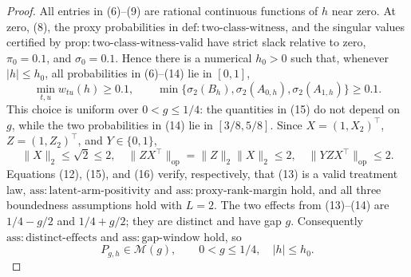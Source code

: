 \documentclass{article}
\begin{document}
\begin{proof}
All entries in (6)--(9) are rational continuous functions of \(h\) near zero.  At zero, (8), the proxy probabilities in \(\mathrm{def:two\text{-}class\text{-}witness}\), and the singular values certified by \(\mathrm{prop:two\text{-}class\text{-}witness\text{-}valid}\) have strict slack relative to zero, \(\pi_0=0.1\), and \(\sigma_0=0.1\).  Hence there is a numerical \(h_0>0\) such that, whenever \(|h|\le h_0\), all probabilities in (6)--(14) lie in \([0,1]\),
\[
 \min_{t,u}w_{tu}(h)\ge0.1,
 \qquad
 \min\{\sigma_2(B_h),\sigma_2(A_{0,h}),\sigma_2(A_{1,h})\}\ge0.1.                \tag{15}
\]
This choice is uniform over \(0<g\le1/4\): the quantities in (15) do not depend on \(g\), while the two probabilities in (14) lie in \([3/8,5/8]\).  Since \(X=(1,X_2)^\top\), \(Z=(1,Z_2)^\top\), and \(Y\in\{0,1\}\),
\[
 \lVert X\rVert_2\le\sqrt2\le2,
 \quad
 \lVert ZX^\top\rVert_{\mathrm{op}}=\lVert Z\rVert_2\lVert X\rVert_2\le2,
 \quad
 \lVert YZX^\top\rVert_{\mathrm{op}}\le2.                                      \tag{16}
\]
Equations (12), (15), and (16) verify, respectively, that (13) is a valid treatment law, \(\mathrm{ass:latent\text{-}arm\text{-}positivity}\) and \(\mathrm{ass:proxy\text{-}rank\text{-}margin}\) hold, and all three boundedness assumptions hold with \(L=2\).  The two effects from (13)--(14) are \(1/4-g/2\) and \(1/4+g/2\); they are distinct and have gap \(g\).  Consequently \(\mathrm{ass:distinct\text{-}effects}\) and \(\mathrm{ass:gap\text{-}window}\) hold, so
\[
 P_{g,h}\in\mathcal M(g),
 \qquad 0<g\le1/4,\quad |h|\le h_0.                                             \tag{17}
\]


\end{proof}
\end{document}
